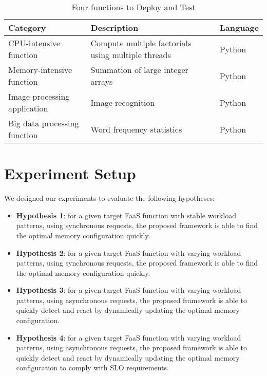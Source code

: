\documentclass[conference]{IEEEtran}
\begin{document}
\begin{table}
\centering

\begin{tabular}{| p{1in} | p{1in} | p{0.75in} |}
\hline
Category & Description & Language \\
\hline

\hline
CPU-intensive function & Compute multiple factorials using multiple threads& Python \\
\hline
Memory-intensive function & Summation of large integer arrays & Python\\
\hline
Image processing application & Image recognition & Python\\
\hline
Big data processing function & Word frequency statistics & Python \\
\hline

\end{tabular}
\caption{Four functions to Deploy and Test}
\label{table: 1}
\end{table}

\section{Experiment Setup}

We designed our experiments to evaluate the following hypotheses:

\begin{itemize}
    \item \textbf{Hypothesis 1}: for a given target FaaS function with stable workload patterns, using synchronous requests, the proposed framework is able to find the optimal memory configuration quickly.

    \item \textbf{Hypothesis 2}: for a given target FaaS function with varying workload patterns, using synchronous requests, the proposed framework is able to find the optimal memory configuration quickly.
    
    \item \textbf{Hypothesis 3}: for a given target FaaS function with varying workload patterns, using asynchronous requests, the proposed framework is able to quickly detect and react by dynamically updating the optimal memory configuration.

    \item \textbf{Hypothesis 4}: for a given target FaaS function with varying workload patterns, using asynchronous requests, the proposed framework is able to quickly detect and react by dynamically updating the optimal memory configuration to comply with SLO requirements.

\end{itemize}
\end{document}
